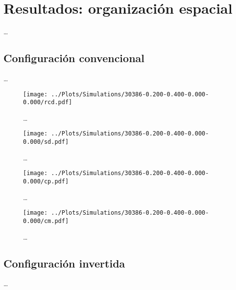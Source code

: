 \chapter{Resultados: organización espacial}
\label{cap:results}

\dots

\section{Configuración convencional}

\dots

\begin{figure}
  \centering
  \texttt{[image: ../Plots/Simulations/30386-0.200-0.400-0.000-0.000/rcd.pdf]}
  \caption{\dots}
  \label{fig:rcd}
\end{figure}

\begin{figure}
  \centering
  \texttt{[image: ../Plots/Simulations/30386-0.200-0.400-0.000-0.000/sd.pdf]}
  \caption{\dots}
  \label{fig:sd}
\end{figure}

\begin{figure}
  \centering
  \texttt{[image: ../Plots/Simulations/30386-0.200-0.400-0.000-0.000/cp.pdf]}
  \caption{\dots}
  \label{fig:cp}
\end{figure}

\begin{figure}
  \centering
  \texttt{[image: ../Plots/Simulations/30386-0.200-0.400-0.000-0.000/cm.pdf]}
  \caption{\dots}
  \label{fig:cm}
\end{figure}

\section{Configuración invertida}

\dots
